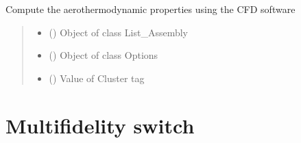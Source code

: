 \documentclass[letterpaper,10pt,english]{sphinxmanual}
\begin{document}
\begin{fulllineitems}
\label{\detokenize{modules:su2.compute_cfd_aerothermo}}
\pysigstartsignatures
{}
\pysigstopsignatures
\sphinxAtStartPar
Compute the aerothermodynamic properties using the CFD software
\begin{quote}\begin{description}
\begin{itemize}
\item {} 
\sphinxAtStartPar
{} () \textendash{} Object of class List\_Assembly

\item {} 
\sphinxAtStartPar
{} ({\hyperref[\detokenize{modules:configuration.Options}]{}}) \textendash{} Object of class Options

\item {} 
\sphinxAtStartPar
{} () \textendash{} Value of Cluster tag

\end{itemize}

\end{description}\end{quote}

\end{fulllineitems}



\section{Multi\sphinxhyphen{}fidelity switch}
\label{\detokenize{modules:multi-fidelity-switch}}
\end{document}
